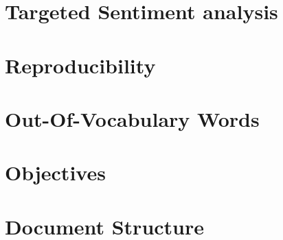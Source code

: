 \documentclass[../../fyp.tex]{subfiles}
\begin{document}
\section{Targeted Sentiment analysis} 

\section{Reproducibility} 

\section{Out-Of-Vocabulary Words} 

\section{Objectives} \label{sec:objectives}

\section{Document Structure}

\end{document}
